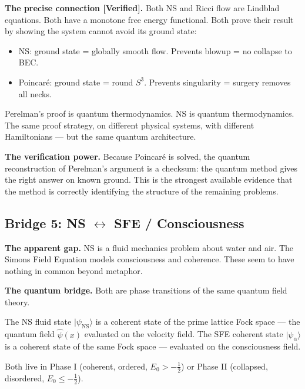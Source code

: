 \documentclass[12pt]{article}
\newcommand{\ket}[1]{|{#1}\rangle}
\newcommand{\half}{\tfrac{1}{2}}
\begin{document}
\begin{tcolorbox}[provedbox]
\textbf{The precise connection [Verified].}
Both NS and Ricci flow are Lindblad equations.
Both have a monotone free energy functional.
Both prove their result by showing the system cannot
avoid its ground state:
\begin{itemize}[itemsep=2pt]
  \item NS: ground state = globally smooth flow.
    Prevents blowup = no collapse to BEC.
  \item Poincar\'{e}: ground state = round $S^3$.
    Prevents singularity = surgery removes all necks.
\end{itemize}
Perelman's proof is quantum thermodynamics.
NS is quantum thermodynamics.
The same proof strategy, on different physical systems,
with different Hamiltonians --- but the same quantum architecture.
\end{tcolorbox}

\textbf{The verification power.}
Because Poincar\'{e} is solved, the quantum reconstruction of
Perelman's argument is a checksum:
the quantum method gives the right answer on known ground.
This is the strongest available evidence that the method
is correctly identifying the structure of the remaining problems.

\subsection{Bridge 5: NS $\longleftrightarrow$ SFE / Consciousness}
\label{sec:bridge-sfe}

\textbf{The apparent gap.}
NS is a fluid mechanics problem about water and air.
The Simons Field Equation models consciousness and coherence.
These seem to have nothing in common beyond metaphor.

\textbf{The quantum bridge.}
Both are phase transitions of the same quantum field theory.

\medskip
The NS fluid state $\ket{\psi_{\mathrm{NS}}}$ is a coherent state of
the prime lattice Fock space --- the quantum field $\hat{\psi}(x)$
evaluated on the velocity field.
The SFE coherent state $\ket{\psi_\alpha}$ is a coherent state
of the same Fock space --- evaluated on the consciousness field.

Both live in Phase I (coherent, ordered, $E_0 > -\half$) or
Phase II (collapsed, disordered, $E_0 \le -\half$).
\end{document}
